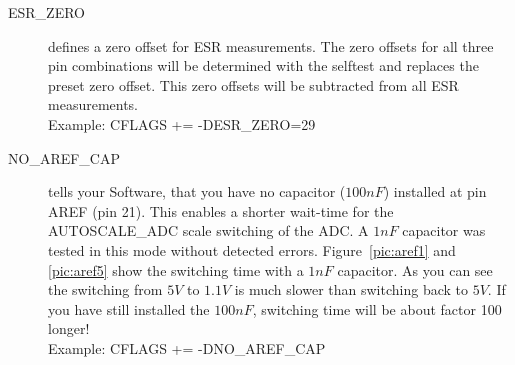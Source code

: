 \begin{description}
  \item[ESR\_ZERO] defines a zero offset for ESR measurements.
The zero offsets for all three pin combinations will be determined with the selftest and replaces the preset zero offset.
This zero offsets will be subtracted from all ESR measurements.\\
Example: CFLAGS += -DESR\_ZERO=29

  \item[NO\_AREF\_CAP] tells your Software, that you have no capacitor (\(100nF\)) installed at pin AREF (pin 21).
This enables a shorter wait-time for the AUTOSCALE\_ADC scale switching of the ADC.
A \(1nF\) capacitor was tested in this mode without detected errors.
Figure~\ref{pic:aref1} and \ref{pic:aref5} show the switching time with a \(1nF\) capacitor.
As you can see the switching from \(5V\) to \(1.1V\) is much slower than switching back to \(5V\). If you
have still installed the \(100nF\), switching time will be about factor 100 longer!\\
Example: CFLAGS += -DNO\_AREF\_CAP
\end{description}
